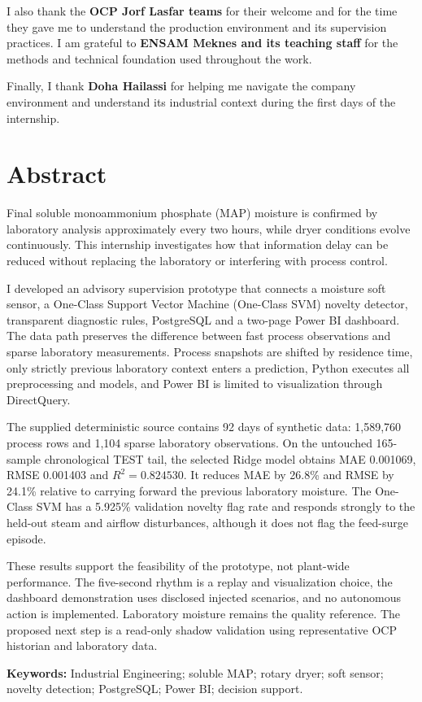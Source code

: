 I also thank the \textbf{OCP Jorf Lasfar teams} for their welcome and for the time they gave me to understand the production environment and its supervision practices. I am grateful to \textbf{ENSAM Meknes and its teaching staff} for the methods and technical foundation used throughout the work.

Finally, I thank \textbf{Doha Hailassi} for helping me navigate the company environment and understand its industrial context during the first days of the internship.

\clearpage
\chapter*{Abstract}
Final soluble monoammonium phosphate (MAP) moisture is confirmed by laboratory analysis approximately every two hours, while dryer conditions evolve continuously. This internship investigates how that information delay can be reduced without replacing the laboratory or interfering with process control.

I developed an advisory supervision prototype that connects a moisture soft sensor, a One-Class Support Vector Machine (One-Class SVM) novelty detector, transparent diagnostic rules, PostgreSQL and a two-page Power BI dashboard. The data path preserves the difference between fast process observations and sparse laboratory measurements. Process snapshots are shifted by residence time, only strictly previous laboratory context enters a prediction, Python executes all preprocessing and models, and Power BI is limited to visualization through DirectQuery.

The supplied deterministic source contains 92 days of synthetic data: 1,589,760 process rows and 1,104 sparse laboratory observations. On the untouched 165-sample chronological TEST tail, the selected Ridge model obtains MAE 0.001069, RMSE 0.001403 and $R^2=0.824530$. It reduces MAE by 26.8\% and RMSE by 24.1\% relative to carrying forward the previous laboratory moisture. The One-Class SVM has a 5.925\% validation novelty flag rate and responds strongly to the held-out steam and airflow disturbances, although it does not flag the feed-surge episode.

These results support the feasibility of the prototype, not plant-wide performance. The five-second rhythm is a replay and visualization choice, the dashboard demonstration uses disclosed injected scenarios, and no autonomous action is implemented. Laboratory moisture remains the quality reference. The proposed next step is a read-only shadow validation using representative OCP historian and laboratory data.

\textbf{Keywords:} Industrial Engineering; soluble MAP; rotary dryer; soft sensor; novelty detection; PostgreSQL; Power BI; decision support.
\clearpage
